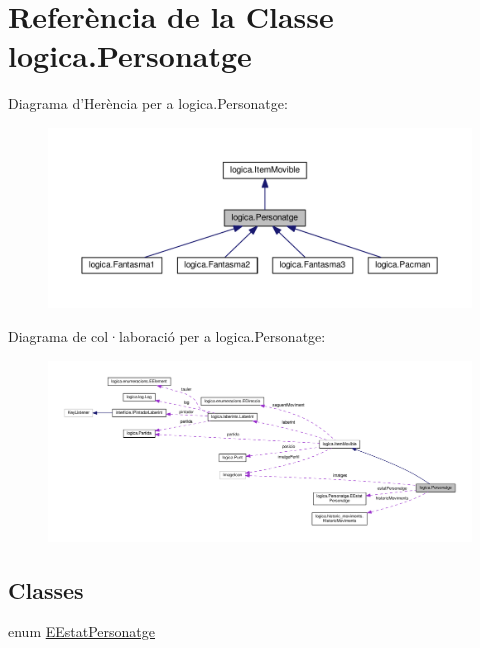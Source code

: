 \hypertarget{classlogica_1_1_personatge}{\section{Referència de la Classe logica.\+Personatge}
\label{classlogica_1_1_personatge}
}


Diagrama d'Herència per a logica.\+Personatge\+:\nopagebreak
\begin{figure}[H]
\begin{center}
\leavevmode
\includegraphics[width=350pt]{classlogica_1_1_personatge__inherit__graph}
\end{center}
\end{figure}


Diagrama de col·laboració per a logica.\+Personatge\+:\nopagebreak
\begin{figure}[H]
\begin{center}
\leavevmode
\includegraphics[width=350pt]{classlogica_1_1_personatge__coll__graph}
\end{center}
\end{figure}
\subsection*{Classes}
\begin{DoxyCompactItemize}
\item 
enum \hyperlink{enumlogica_1_1_personatge_1_1_e_estat_personatge}{E\+Estat\+Personatge}
\end{DoxyCompactItemize}
